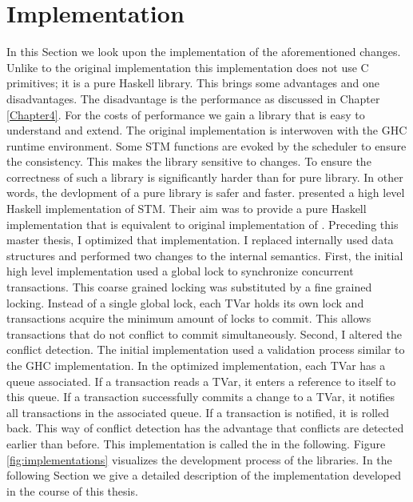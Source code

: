 
\chapter{Implementation} %

\label{Chapter3}

In this Section we look upon the implementation of the aforementioned changes. Unlike to the original
implementation this implementation does not use C primitives; it is a pure Haskell library. This brings some advantages 
and one disadvantages. The disadvantage is the performance as discussed in Chapter \ref{Chapter4}.
For the costs of performance we gain a library that is easy to understand and extend. The original 
implementation is interwoven with the GHC runtime environment. Some STM functions are evoked by 
the scheduler to ensure the consistency. This makes the library sensitive to changes. 
To ensure the correctness of such a library is significantly harder than for pure library. 
In other words, the devlopment of a pure library is safer
and faster. \parencite{STMHigh} presented a high level Haskell implementation of STM. Their aim
was to provide a pure Haskell implementation that is equivalent to original implementation of 
\parencite{STMBase}. Preceding this master thesis, I optimized that implementation. I replaced
internally used data structures and performed two changes to the internal semantics. First, 
the initial high level implementation used a global lock to synchronize concurrent transactions.
This coarse grained locking was substituted by a fine grained locking. Instead of a single
global lock, each TVar holds its own lock and transactions acquire the minimum amount of 
locks to commit. This allows transactions that do not conflict to commit simultaneously.
Second, I altered the conflict detection. The initial implementation used a validation process
similar to the GHC implementation. In the optimized implementation, each TVar has a queue associated. If a transaction reads 
a TVar, it enters a reference to itself to this queue. If a transaction successfully commits a change to a TVar, it 
notifies all transactions in the associated queue. If a transaction is notified, it is rolled back.
This way of conflict detection has the advantage that conflicts are detected earlier than before.
This implementation is called the  in the following. Figure 
\ref{fig:implementations} visualizes the development process of the libraries.
In the following Section we give a detailed description of the implementation developed in the course of this 
thesis. 

